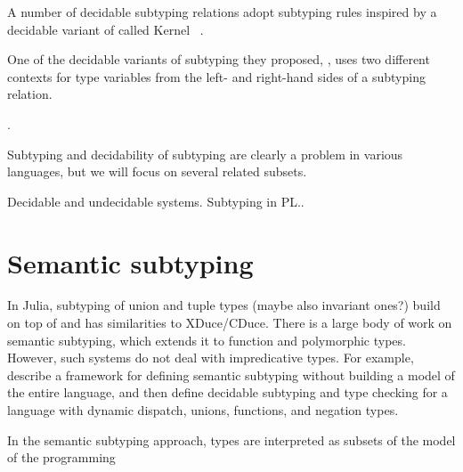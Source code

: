 A number of decidable subtyping relations adopt subtyping rules
inspired by a decidable variant of \FSub
called Kernel \FSub~\cite{cardelli:types-poly:1985}.

One of the decidable variants of
subtyping they proposed, \WyvFix, uses two different contexts for
type variables from the left- and right-hand sides of a subtyping relation.



\cite{hu:dot-undec:2020,mackay:bound-poly-sub-dec:2020,kennedy:nom-sub-var-dec:2007}.



Subtyping and decidability of subtyping are clearly a problem in various languages,
but we will focus on several related subsets.

Decidable and undecidable systems. Subtyping in PL..

\section{Semantic subtyping}

In Julia, subtyping of union and tuple types (maybe also invariant ones?) build
on top of  and has similarities to XDuce/CDuce.
There is a large body of work on semantic subtyping, which extends it to
function and polymorphic types. However, such systems do not deal with
impredicative types.
For example, \citet{frih:sem-sub:2008} describe a framework for defining semantic
subtyping without building a model of the entire language, and then define
decidable subtyping and type checking for a language with dynamic dispatch,
unions, functions, and negation types.

In the semantic subtyping approach, types are interpreted as subsets of the
model of the programming

